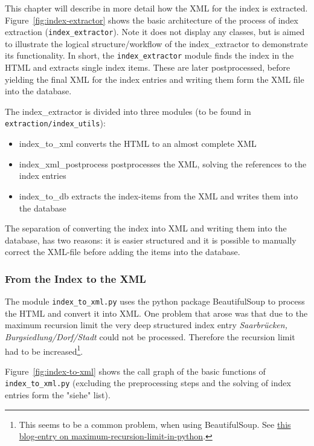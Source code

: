 This chapter will describe in more detail how the XML for the index is extracted. 
Figure~\ref{fig:index-extractor} shows the basic architecture of the process of index extraction (\texttt{index\_extractor}). Note it does not display any classes, but is aimed to illustrate the logical structure/workflow of the index\_extractor to demonstrate its functionality. In short, the \texttt{index\_extractor} module finds the index in the HTML and extracts single index items. These are later postprocessed, before yielding the final XML for the index entries and writing them form the XML file into the database.

The index\_extractor is divided into three modules (to be found in \texttt{extraction/index\_utils}):

\begin{itemize}
\item index\_to\_xml converts the HTML to an almost complete XML
\item index\_xml\_postprocess postprocesses the XML, solving the references to the index entries
\item index\_to\_db extracts the index-items from the XML and writes them into the database
\end{itemize}

The separation of converting the index into XML and writing them into the database, has two reasons: it is easier structured and it is possible to manually correct the XML-file before adding the items into the database.

\subsubsection{From the Index to the XML}
The module \texttt{index\_to\_xml.py} uses the python package BeautifulSoup to process the HTML and convert it into XML. One problem that arose was that due to the maximum recursion limit the very deep structured index entry \textit{Saarbrücken, Burgsiedlung/Dorf/Stadt} could not be processed. Therefore the recursion limit had to be increased\footnote{This seems to be a common problem, when using BeautifulSoup. See \href{http://blog.pablohoffman.com/maximum-recursion-limit-in-python}{this blog-entry on maximum-recursion-limit-in-python}.}.

Figure~\ref{fig:index-to-xml} shows the call graph of the basic functions of \texttt{index\_to\_xml.py} (excluding the preprocessing steps and the solving of index entries form the "siehe" list).

